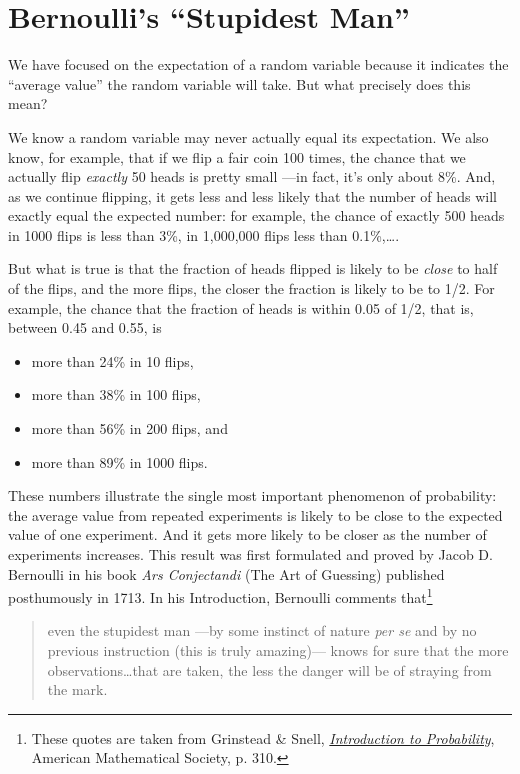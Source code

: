 \documentclass[11pt,twoside]{article}
\begin{document}


\section{Bernoulli's ``Stupidest Man''}

We have focused on the expectation of a random variable because it
indicates the ``average value'' the random variable will take.  But what
precisely does this mean?

We know a random variable may never actually equal its expectation.  We
also know, for example, that if we flip a fair coin 100 times, the chance
that we actually flip \emph{exactly} 50 heads is pretty small ---in fact,
it's only about 8\%.  And, as we continue flipping, it gets less and
less likely that the number of heads will exactly equal the expected
number: for example, the chance of exactly 500 heads in 1000 flips is
less than 3\%, in 1,000,000 flips less than 0.1\%,\dots.

But what is true is that the fraction of heads flipped is likely to be
\emph{close} to half of the flips, and the more flips, the closer the
fraction is likely to be to 1/2.  For example, the chance that the
fraction of heads is within 0.05 of 1/2, that is, between 0.45 and 0.55, is
\begin{itemize}
\item more than 24\% in 10 flips,
\item more than 38\% in 100 flips,
\item more than 56\% in 200 flips, and
\item more than 89\% in 1000 flips.
\end{itemize}


These numbers illustrate the single most important phenomenon of
probability: the average value from repeated experiments is likely to be
close to the expected value of one experiment.  And it gets more likely to
be closer as the number of experiments increases.  This result was first
formulated and proved by Jacob D. Bernoulli in his book \emph{Ars
Conjectandi} (The Art of Guessing) published posthumously in 1713.  In his
Introduction, Bernoulli comments that\footnote{These quotes are taken from
Grinstead \& Snell,
\href{http://www.dartmouth.edu/~chance/teaching_aids/books_articles/probability_book/book.html}
{\emph{Introduction to Probability}}, American Mathematical Society,
p. 310.}
\begin{quote}
even the stupidest man ---by some instinct of nature \emph{per se} and by
no previous instruction (this is truly amazing)--- knows for sure that the
more observations\dots that are taken, the less the danger will be of
straying from the mark.
\end{quote}
\end{document}
